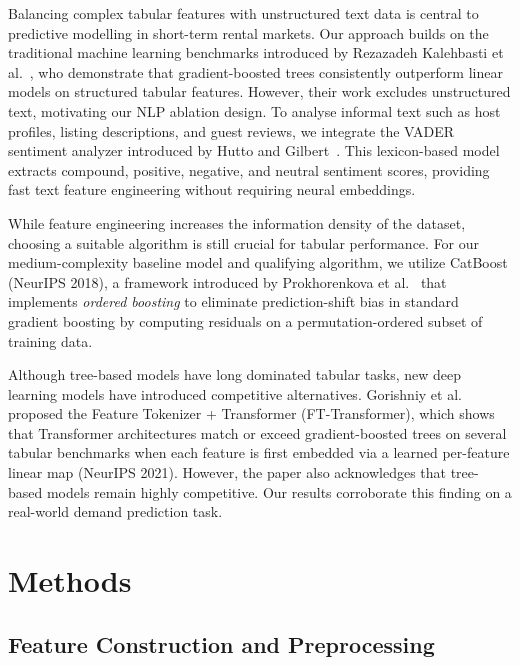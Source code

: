 \documentclass[10pt,a4paper]{article}
\begin{document}
Balancing complex tabular features with unstructured text data is central to
predictive modelling in short-term rental markets. Our approach builds on the
traditional machine learning benchmarks introduced by Rezazadeh Kalehbasti et
al.~\cite{rezazadeh2021}, who demonstrate that gradient-boosted trees
consistently outperform linear models on structured tabular features. However,
their work excludes unstructured text, motivating our NLP ablation design. To
analyse informal text such as host profiles, listing descriptions, and guest
reviews, we integrate the VADER sentiment analyzer
introduced by Hutto and Gilbert~\cite{hutto2014}. This lexicon-based model extracts compound,
positive, negative, and neutral sentiment scores,  providing fast text feature engineering 
without requiring neural embeddings.

While feature engineering increases the information density of the dataset, choosing a 
suitable algorithm is still crucial for tabular performance. For our medium-complexity 
baseline model and qualifying algorithm, we utilize CatBoost (NeurIPS 2018), a framework 
introduced by Prokhorenkova et al.~\cite{prokhorenkova2018} that implements \textit{ordered 
boosting} to eliminate prediction-shift bias in standard gradient boosting by computing
residuals on a permutation-ordered subset of training data.

Although tree-based models have long dominated tabular tasks, new deep
learning models have introduced competitive alternatives. Gorishniy et
al.~\cite{gorishniy2021} proposed the Feature Tokenizer + Transformer (FT-Transformer), which 
shows that Transformer architectures match or exceed gradient-boosted trees on several 
tabular benchmarks when each feature is first embedded via a learned per-feature linear map 
(NeurIPS 2021). However, the paper also acknowledges that tree-based models remain highly 
competitive. Our results corroborate this finding on a real-world demand prediction task.

\section{Methods}

\subsection{Feature Construction and Preprocessing}
\end{document}
